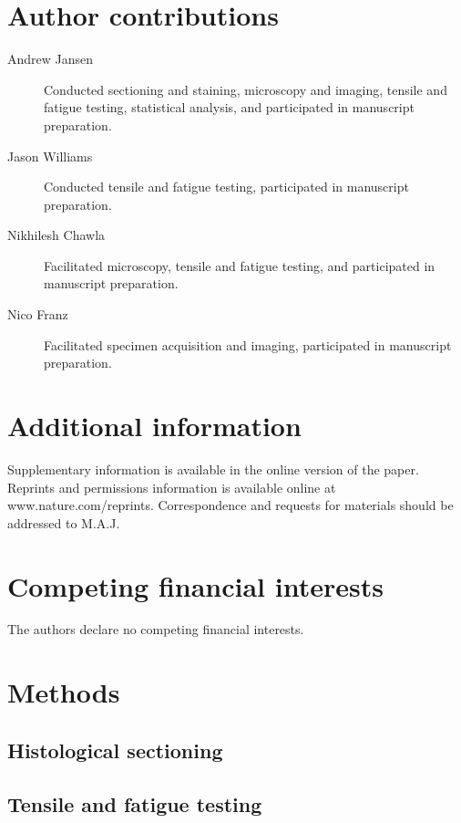 \documentclass[twocolumn, linenumbers, superscriptaddress]{revtex4-1}
\begin{document}
	\section*{Author contributions}
		\begin{description}
		\item[Andrew Jansen] Conducted sectioning and staining, microscopy and imaging, tensile and fatigue testing, statistical analysis, and participated in manuscript preparation.
		\item[Jason Williams] Conducted tensile and fatigue testing, participated in manuscript preparation.
		\item[Nikhilesh Chawla] Facilitated microscopy, tensile and fatigue testing, and participated in manuscript preparation.
		\item[Nico Franz] Facilitated specimen acquisition and imaging, participated in manuscript preparation.
		\end{description} 
	
	\section*{Additional information}
		Supplementary information is available in the online version of the paper.
		Reprints and permissions information is available online at www.nature.com/reprints.
		Correspondence and requests for materials should be addressed to M.A.J.
	
	\section*{Competing financial interests}
		The authors declare no competing financial interests.
	
	\newpage

	\section*{Methods}
		\subsection*{Histological sectioning}
			
		\subsection*{Tensile and fatigue testing}
\end{document}
